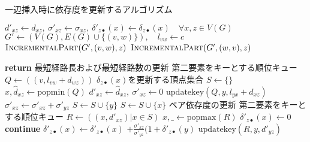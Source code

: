 \begin{algorithm}[tbp]
  \caption{一辺挿入時に依存度を更新するアルゴリズム}
  \label{algo:incremental-algorithm}
  \begin{algorithmic}[1]\scriptsize
    \State $d'_{xz}\gets d_{xz},\:\sigma'_{xz}\gets \sigma_{xz},\:\delta'_{z\bullet}(x)\gets \delta_{z\bullet}(x)\quad\forall x,z\in V(G)$
    \State $G'\gets(V(G),E(G)\cup\{(v,w)\}),\quad l_{vw}\gets c$
    \State $\textsc{IncrementalPart}(G',(v,w),z)$
    \Else
    \State $\textsc{IncrementalPart}(G',(w,v),z)$
    \EndIf
    \EndFor
    \EndProcedure
  \end{algorithmic}
  \vspace{-.5cm}
  \begin{multicols}{2}
    \begin{algorithmic}[1]\scriptsize
      \makeatletter
      \setcounter{ALG@line}{11}
      \makeatother
      \State \textbf{return}
      \EndIf
      \State \LeftComment 最短経路長および最短経路数の更新
      \State \LeftComment 第二要素をキーとする順位キュー
      \State $Q\gets((v,l_{vw}+d_{wz}))$
      \State \LeftComment $\delta_{z\bullet}(x)$を更新する頂点集合
      \State $S\gets\{\}$
      \State $x,\hat{d}_{xz}\gets\mathrm{popmin}(Q)$
      \State $d'_{xz}\gets\hat{d}_{xz},\:\sigma'_{xz}\gets 0$
      \State $\mathrm{updatekey}(Q,y,l_{yx}+d_{xz})$
      \EndIf
      \State $\sigma'_{xz}\gets\sigma'_{xz}+\sigma'_{yz}$
      \EndIf
      \State $S\gets S\cup\{y\}$
      \EndIf
      \EndFor
      \State $S\gets S\cup\{x\}$
      \EndIf
      \EndWhile
      \State \LeftComment ペア依存度の更新
      \State \LeftComment 第二要素をキーとする順位キュー
      \State $R\gets((x,d'_{xz})\vert x\in S)$
      \State $x,\_\gets\mathrm{popmax}(R)$
      \State $\delta'_{z\bullet}(x)\gets 0$
      \State \textbf{continue}
      \EndIf
      \State $\delta'_{z\bullet}(x)\gets\delta'_{z\bullet}(x)$
      $+\frac{\sigma'_{xz}}{\sigma'_{yz}}(1+\delta'_{z\bullet}(y)$
      \State $\mathrm{updatekey}(R, y, d'_{yz})$
      \EndIf
      \EndFor
      \EndWhile
      \EndProcedure
    \end{algorithmic}
  \end{multicols}
\end{algorithm}

